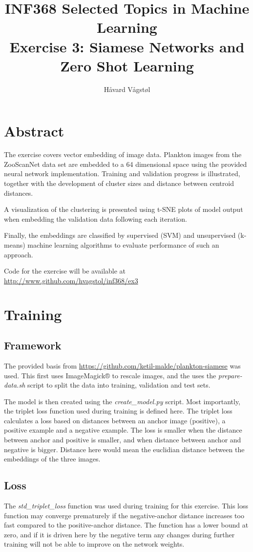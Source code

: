 \documentclass[10pt]{article}
\title{ INF368 Selected Topics in Machine Learning \\
		\huge Exercise 3: Siamese Networks and Zero Shot Learning}
\author{Håvard Vågstøl}
\begin{document}
\maketitle
\section{Abstract}
The exercise covers vector embedding of image data. Plankton images from the ZooScanNet data set are embedded to a 64 dimensional space using the provided neural network implementation. Training and validation progress is illustrated, together with the development of cluster sizes and distance between centroid distances.

A visualization of the clustering is presented using t-SNE plots of model output when embedding the validation data following each iteration.

Finally, the embeddings are classified by supervised (SVM) and unsupervised (k-means) machine learning algorithms to evaluate performance of such an approach.

Code for the exercise will be available at \url{http://www.github.com/hvagstol/inf368/ex3}

\pagebreak

\section{Training}

\subsection{Framework}
The provided basis from \url{https://github.com/ketil-malde/plankton-siamese} was used. This first uses ImageMagick® to rescale images, and the uses the \emph{prepare-data.sh} script to split the data into training, validation and test sets.

The model is then created using the \emph{create\_model.py} script. Most importantly, the triplet loss function used during training is defined here. The triplet loss calculates a loss based on distances between an anchor image (positive), a positive example and a negative example. The loss is smaller when the distance between anchor and positive is smaller, and when distance between anchor and negative is bigger. Distance here would mean the euclidian distance between the embeddings of the three images.

\subsection{Loss}
The \emph{std\_triplet\_loss} function was used during training for this exercise. This loss function may converge prematurely if the negative-anchor distance increases too fast compared to the positive-anchor distance. The function has a lower bound at zero, and if it is driven here by the negative term any changes during further training will not be able to improve on the network weights.
\end{document}
